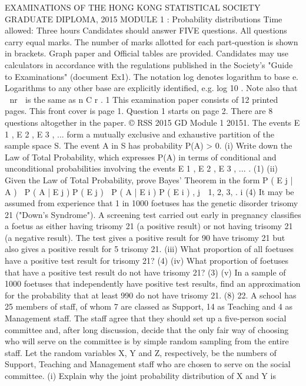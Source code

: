 EXAMINATIONS OF THE HONG KONG STATISTICAL SOCIETY
GRADUATE DIPLOMA, 2015
MODULE 1 : Probability distributions
Time allowed: Three hours
Candidates should answer FIVE questions.
All questions carry equal marks.
The number of marks allotted for each part-question is shown in brackets.
Graph paper and Official tables are provided.
Candidates may use calculators in accordance with the regulations published in
the Society's "Guide to Examinations" (document Ex1).
The notation log denotes logarithm to base e.
Logarithms to any other base are explicitly identified, e.g. log 10 .
Note also that
 nr  is the same as
n
C r .
1
This examination paper consists of 12 printed pages.
This front cover is page 1.
Question 1 starts on page 2.
There are 8 questions altogether in the paper.
© RSS 2015
GD Module 1 20151.
The events E 1 , E 2 , E 3 , ... form a mutually exclusive and exhaustive partition of the
sample space S. The event A in S has probability P(A) > 0.
(i) Write down the Law of Total Probability, which expresses P(A) in terms of
conditional and unconditional probabilities involving the events E 1 , E 2 , E 3 , ... .
(1)
(ii) Given the Law of Total Probability, prove Bayes' Theorem in the form
P ( E j | A ) 
P ( A | E j ) P ( E j )
 P ( A | E i ) P ( E i )
,
j  1, 2, 3,
.
i
(4)
It may be assumed from experience that 1 in 1000 foetuses has the genetic disorder
trisomy 21 ("Down's Syndrome"). A screening test carried out early in pregnancy
classifies a foetus as either having trisomy 21 (a positive result) or not having
trisomy 21 (a negative result). The test gives a positive result for 90%
have trisomy 21 but also gives a positive result for 5%
trisomy 21.
(iii)
What proportion of all foetuses have a positive test result for trisomy 21?
(4)
(iv) What proportion of foetuses that have a positive test result do not have
trisomy 21?
(3)
(v) In a sample of 1000 foetuses that independently have positive test results, find
an approximation for the probability that at least 990 do not have trisomy 21.
(8)
22.
A school has 25 members of staff, of whom 7 are classed as Support, 14 as Teaching
and 4 as Management staff. The staff agree that they should set up a five-person
social committee and, after long discussion, decide that the only fair way of choosing
who will serve on the committee is by simple random sampling from the entire staff.
Let the random variables X, Y and Z, respectively, be the numbers of Support,
Teaching and Management staff who are chosen to serve on the social committee.
(i)
Explain why the joint probability distribution of X and Y is
